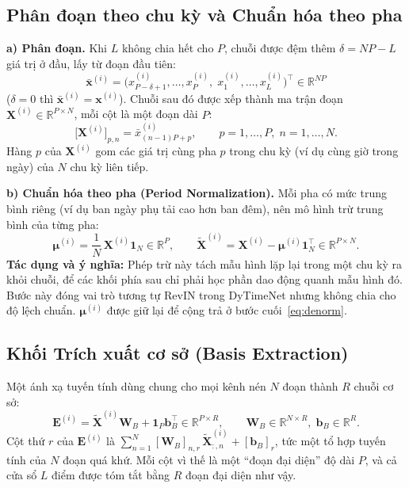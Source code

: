 \documentclass[12pt,a4paper]{report}
\numberwithin{equation}{chapter}
\newcommand{\R}{\mathbb{R}}
\newcommand{\one}{\mathbf{1}}
\begin{document}
\subsection{Phân đoạn theo chu kỳ và Chuẩn hóa theo pha}
\label{sec:segment}

\textbf{a) Phân đoạn.} Khi $L$ không chia hết cho $P$, chuỗi được đệm thêm $\delta=NP-L$ giá trị ở đầu, lấy từ đoạn
đầu tiên:
\begin{equation}
\bar{\mathbf{x}}^{(i)} = \big(x^{(i)}_{P-\delta+1},\dots,x^{(i)}_{P},\;x^{(i)}_1,\dots,x^{(i)}_L\big)^{\!\top}\in\R^{NP}
\label{eq:pad}
\end{equation}
($\delta=0$ thì $\bar{\mathbf{x}}^{(i)}=\mathbf{x}^{(i)}$). Chuỗi sau đó được xếp thành ma trận đoạn
$\mathbf{X}^{(i)}\in\R^{P\times N}$, mỗi cột là một đoạn dài $P$:
\begin{equation}
\big[\mathbf{X}^{(i)}\big]_{p,n} = \bar{x}^{(i)}_{(n-1)P+p},\qquad p=1,\dots,P,\; n=1,\dots,N.
\label{eq:segment}
\end{equation}
Hàng $p$ của $\mathbf{X}^{(i)}$ gom các giá trị cùng pha $p$ trong chu kỳ (ví dụ cùng giờ trong ngày) của $N$ chu kỳ
liên tiếp.

\textbf{b) Chuẩn hóa theo pha (Period Normalization).} Mỗi pha có mức trung bình riêng (ví dụ ban ngày phụ tải
cao hơn ban đêm), nên mô hình trừ trung bình của từng pha:
\begin{equation}
\bm{\mu}^{(i)} = \frac{1}{N}\,\mathbf{X}^{(i)}\one_N \in\R^{P},\qquad
\tilde{\mathbf{X}}^{(i)} = \mathbf{X}^{(i)} - \bm{\mu}^{(i)}\one_N^{\top}\in\R^{P\times N}.
\label{eq:period-norm}
\end{equation}
\textbf{Tác dụng và ý nghĩa:} Phép trừ này tách mẫu hình lặp lại trong một chu kỳ ra khỏi chuỗi, để các khối phía sau
chỉ phải học phần dao động quanh mẫu hình đó. Bước này đóng vai trò tương tự RevIN trong DyTimeNet nhưng không chia
cho độ lệch chuẩn. $\bm{\mu}^{(i)}$ được giữ lại để cộng trả ở bước cuối~\eqref{eq:denorm}.

\subsection{Khối Trích xuất cơ sở (Basis Extraction)}
\label{sec:basis}

Một ánh xạ tuyến tính dùng chung cho mọi kênh nén $N$ đoạn thành $R$ chuỗi cơ sở:
\begin{equation}
\mathbf{E}^{(i)} = \tilde{\mathbf{X}}^{(i)}\mathbf{W}_B + \one_P\mathbf{b}_B^{\top}\in\R^{P\times R},
\qquad \mathbf{W}_B\in\R^{N\times R},\;\mathbf{b}_B\in\R^{R}.
\label{eq:basis}
\end{equation}
Cột thứ $r$ của $\mathbf{E}^{(i)}$ là $\sum_{n=1}^{N}[\mathbf{W}_B]_{n,r}\,\tilde{\mathbf{X}}^{(i)}_{:,n}+[\mathbf{b}_B]_r$,
tức một tổ hợp tuyến tính của $N$ đoạn quá khứ. Mỗi cột vì thế là một ``đoạn đại diện'' độ dài $P$, và cả cửa sổ
$L$ điểm được tóm tắt bằng $R$ đoạn đại diện như vậy.
\end{document}
